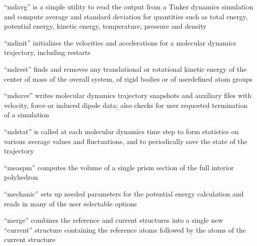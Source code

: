 \documentclass[letterpaper,11pt,english]{sphinxmanual}
\begin{document}
\sphinxAtStartPar
“mdavg” is a simple utility to read the output from a Tinker dynamics simulation and compute average and standard deviation for quantities such as total energy, potential energy, kinetic energy, temperature, pressure and density

\sphinxAtStartPar
{}

\sphinxAtStartPar
“mdinit” initializes the velocities and accelerations for a molecular dynamics trajectory, including restarts

\sphinxAtStartPar
{}

\sphinxAtStartPar
“mdrest” finds and removes any translational or rotational kinetic energy of the center of mass of the overall system, of rigid bodies or of user\sphinxhyphen{}defined atom groups

\sphinxAtStartPar
{}

\sphinxAtStartPar
“mdsave” writes molecular dynamics trajectory snapshots and auxiliary files with velocity, force or induced dipole data; also checks for user requested termination of a simulation

\sphinxAtStartPar
{}

\sphinxAtStartPar
“mdstat” is called at each molecular dynamics time step to form statistics on various average values and fluctuations, and to periodically save the state of the trajectory

\sphinxAtStartPar
{}

\sphinxAtStartPar
{}

\sphinxAtStartPar
{}

\sphinxAtStartPar
{}

\sphinxAtStartPar
“measpm” computes the volume of a single prism section of the full interior polyhedron

\sphinxAtStartPar
{}

\sphinxAtStartPar
“mechanic” sets up needed parameters for the potential energy calculation and reads in many of the user selectable options

\sphinxAtStartPar
{}

\sphinxAtStartPar
“merge” combines the reference and current structures into a single new “current” structure containing the reference atoms followed by the atoms of the current structure
\end{document}
